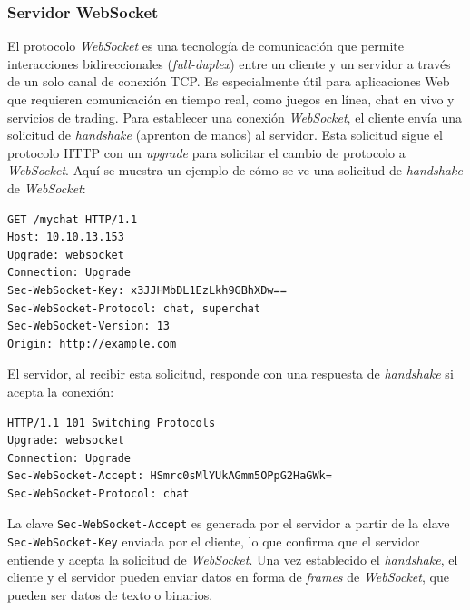\subsubsection{Servidor WebSocket}\label{sec:serverWebSocket}
 
El protocolo \textit{WebSocket} es una tecnología de comunicación que permite interacciones bidireccionales (\textit{full-duplex}) entre un cliente y un servidor a través de un solo canal de conexión TCP. Es especialmente útil para aplicaciones Web que requieren comunicación en tiempo real, como juegos en línea, chat en vivo y servicios de trading. Para establecer una conexión \textit{WebSocket}, el cliente envía una solicitud de  \textit{handshake} (aprenton de manos) al servidor. Esta solicitud sigue el protocolo HTTP con un \textit{upgrade} para solicitar el cambio de protocolo a \textit{WebSocket}. Aquí se muestra un ejemplo de cómo se ve una solicitud de \textit{handshake} de \textit{WebSocket}:

\begin{verbatim}
GET /mychat HTTP/1.1
Host: 10.10.13.153
Upgrade: websocket
Connection: Upgrade
Sec-WebSocket-Key: x3JJHMbDL1EzLkh9GBhXDw==
Sec-WebSocket-Protocol: chat, superchat
Sec-WebSocket-Version: 13
Origin: http://example.com
\end{verbatim}

El servidor, al recibir esta solicitud, responde con una respuesta de \textit{handshake} si acepta la conexión:

\begin{verbatim}
HTTP/1.1 101 Switching Protocols
Upgrade: websocket
Connection: Upgrade
Sec-WebSocket-Accept: HSmrc0sMlYUkAGmm5OPpG2HaGWk=
Sec-WebSocket-Protocol: chat
\end{verbatim}

La clave \texttt{Sec-WebSocket-Accept} es generada por el servidor a partir de la clave \texttt{Sec-WebSocket-Key} enviada por el cliente, lo que confirma que el servidor entiende y acepta la solicitud de \textit{WebSocket}. Una vez establecido el \textit{handshake}, el cliente y el servidor pueden enviar datos en forma de \textit{frames} de \textit{WebSocket}, que pueden ser datos de texto o binarios.


